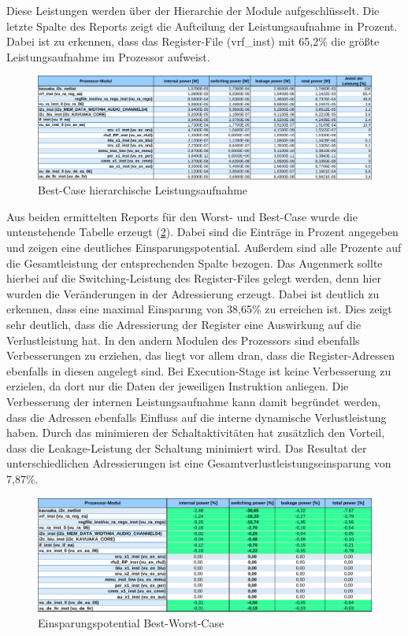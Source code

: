 Diese Leistungen werden über der Hierarchie der Module aufgeschlüsselt. Die letzte Spalte des Reports zeigt die Aufteilung der Leistungsaufnahme in Prozent. Dabei ist zu erkennen, dass das Register-File (vrf\_inst) mit 65,2\% die größte Leistungsaufnahme im Prozessor aufweist.

\begin{figure}[H] 
	\centering
	\includegraphics[width=\textwidth]{fig/best_hierarchy_report.pdf}
	\caption{Best-Case hierarchische Leistungsaufnahme}
	\label{fig:best_power_hierarchy}
\end{figure}

Aus beiden ermittelten Reports für den Worst- und Best-Case wurde die untenstehende Tabelle erzeugt (\ref{fig:best_powersave}). Dabei sind die Einträge in Prozent angegeben und zeigen eine deutliches Einsparungspotential. Außerdem sind alle Prozente auf die Gesamtleistung der entsprechenden Spalte bezogen. Das Augenmerk sollte hierbei auf die Switching-Leistung des Register-Files gelegt werden, denn hier wurden die Veränderungen in der Adressierung erzeugt. Dabei ist deutlich zu erkennen, dass eine maximal Einsparung von 38,65\% zu erreichen ist. Dies zeigt sehr deutlich, dass die Adressierung der Register eine Auswirkung auf die Verlustleistung hat. In den andern Modulen des Prozessors sind ebenfalls Verbesserungen zu erziehen, das liegt vor allem dran, dass die Register-Adressen ebenfalls in diesen angelegt sind. Bei Execution-Stage ist keine Verbesserung zu erzielen, da dort nur die Daten der jeweiligen Instruktion anliegen. Die Verbesserung der internen Leistungsaufnahme kann damit begründet werden, dass die Adressen ebenfalls Einfluss auf die interne dynamische Verlustleistung haben.
Durch das minimieren der Schaltaktivitäten hat zusätzlich den Vorteil, dass die Leakage-Leistung der Schaltung minimiert wird. Das Resultat der unterschiedlichen Adressierungen ist eine Gesamtverlustleistungseinsparung von 7,87\%.

\begin{figure}[H] 
	\centering
	\includegraphics[width=\textwidth]{fig/best_worst_compare.pdf}
	\caption{Einsparungspotential Best-Worst-Case}
	\label{fig:best_powersave}
\end{figure}
